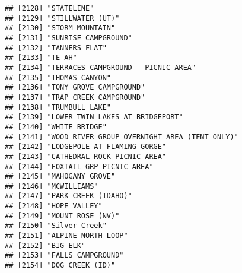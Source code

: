 \documentclass[
]{article}
\begin{document}
\begin{verbatim}
## [2128] "STATELINE"                                                                           
## [2129] "STILLWATER (UT)"                                                                     
## [2130] "STORM MOUNTAIN"                                                                      
## [2131] "SUNRISE CAMPGROUND"                                                                  
## [2132] "TANNERS FLAT"                                                                        
## [2133] "TE-AH"                                                                               
## [2134] "TERRACES CAMPGROUND - PICNIC AREA"                                                   
## [2135] "THOMAS CANYON"                                                                       
## [2136] "TONY GROVE CAMPGROUND"                                                               
## [2137] "TRAP CREEK CAMPGROUND"                                                               
## [2138] "TRUMBULL LAKE"                                                                       
## [2139] "LOWER TWIN LAKES AT BRIDGEPORT"                                                      
## [2140] "WHITE BRIDGE"                                                                        
## [2141] "WOOD RIVER GROUP OVERNIGHT AREA (TENT ONLY)"                                         
## [2142] "LODGEPOLE AT FLAMING GORGE"                                                          
## [2143] "CATHEDRAL ROCK PICNIC AREA"                                                          
## [2144] "FOXTAIL GRP PICNIC AREA"                                                             
## [2145] "MAHOGANY GROVE"                                                                      
## [2146] "MCWILLIAMS"                                                                          
## [2147] "PARK CREEK (IDAHO)"                                                                  
## [2148] "HOPE VALLEY"                                                                         
## [2149] "MOUNT ROSE (NV)"                                                                     
## [2150] "Silver Creek"                                                                        
## [2151] "ALPINE NORTH LOOP"                                                                   
## [2152] "BIG ELK"                                                                             
## [2153] "FALLS CAMPGROUND"                                                                    
## [2154] "DOG CREEK (ID)"                                                                      

\end{verbatim}
\end{document}
